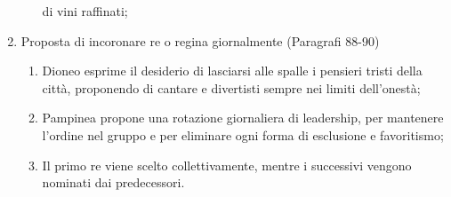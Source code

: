 \documentclass{article}
\begin{document}
\begin{enumerate}
\begin{enumerate}[label*=\arabic*.]
                di vini raffinati;
        \end{enumerate}
    \item Proposta di incoronare re o regina giornalmente (Paragrafi 88-90)
        \begin{enumerate}[label*=\arabic*.]
            \item Dioneo esprime il desiderio di lasciarsi alle spalle i pensieri tristi della
                città, proponendo di cantare e divertisti sempre nei limiti dell'onestà;
            \item Pampinea propone una rotazione giornaliera di leadership, per mantenere
                l'ordine nel gruppo e per eliminare ogni forma di esclusione e favoritismo;
            \item Il primo re viene scelto collettivamente, mentre i successivi vengono
                nominati dai predecessori.
        \end{enumerate}
\end{enumerate}

\newpage
\end{document}
